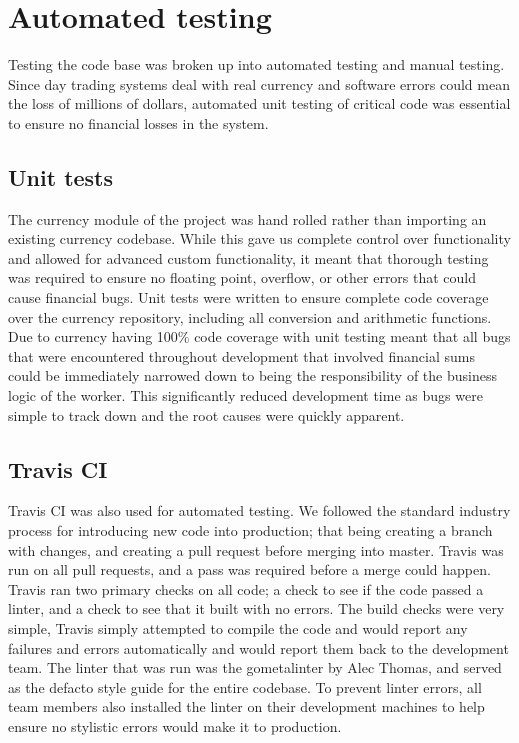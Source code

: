 \section{Automated testing}
Testing the code base was broken up into automated testing and manual testing.  Since day trading systems deal with real currency and software errors could mean the loss of millions of dollars, automated unit testing of critical code was essential to ensure no financial losses in the system.

\subsection{Unit tests}
The currency module of the project was hand rolled rather than importing an existing currency codebase.  While this gave us complete control over functionality and allowed for advanced custom functionality, it meant that thorough testing was required to ensure no floating point, overflow, or other errors that could cause financial bugs.  Unit tests were written to ensure complete code coverage over the currency repository, including all conversion and arithmetic functions.  Due to currency having 100\% code coverage with unit testing meant that all bugs that were encountered throughout development that involved financial sums could be immediately narrowed down to being the responsibility of the business logic of the worker.  This significantly reduced development time as bugs were simple to track down and the root causes were quickly apparent.

\subsection{Travis CI}
Travis CI was also used for automated testing.  We followed the standard industry process for introducing new code into production; that being creating a branch with changes, and creating a pull request before merging into master.  Travis was run on all pull requests, and a pass was required before a merge could happen.  Travis ran two primary checks on all code; a check to see if the code passed a linter, and a check to see that it built with no errors.  The build checks were very simple, Travis simply attempted to compile the code and would report any failures and errors automatically and would report them back to the development team.  The linter that was run was the gometalinter by Alec Thomas, and served as the defacto style guide for the entire codebase.  To prevent linter errors, all team members also installed the linter on their development machines to help ensure no stylistic errors would make it to production.